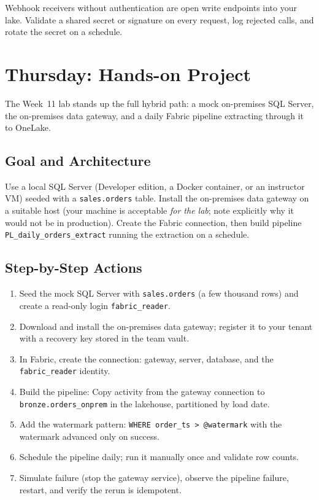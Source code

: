 \begin{pitfall}
Webhook receivers without authentication are open write endpoints into your lake. Validate a shared secret or signature on every request, log rejected calls, and rotate the secret on a schedule.
\end{pitfall}

\section{Thursday: Hands-on Project}
The Week~11 lab stands up the full hybrid path: a mock on-premises SQL Server, the on-premises data gateway, and a daily Fabric pipeline extracting through it to OneLake.

\subsection{Goal and Architecture}
Use a local SQL Server (Developer edition, a Docker container, or an instructor VM) seeded with a \texttt{sales.orders} table. Install the on-premises data gateway on a suitable host (your machine is acceptable \emph{for the lab}; note explicitly why it would not be in production). Create the Fabric connection, then build pipeline \texttt{PL\_daily\_orders\_extract} running the extraction on a schedule.

\subsection{Step-by-Step Actions}
\begin{enumerate}
    \item Seed the mock SQL Server with \texttt{sales.orders} (a few thousand rows) and create a read-only login \texttt{fabric\_reader}.
    \item Download and install the on-premises data gateway; register it to your tenant with a recovery key stored in the team vault.
    \item In Fabric, create the connection: gateway, server, database, and the \texttt{fabric\_reader} identity.
    \item Build the pipeline: Copy activity from the gateway connection to \texttt{bronze.orders\_onprem} in the lakehouse, partitioned by load date.
    \item Add the watermark pattern: \texttt{WHERE order\_ts > @watermark} with the watermark advanced only on success.
    \item Schedule the pipeline daily; run it manually once and validate row counts.
    \item Simulate failure (stop the gateway service), observe the pipeline failure, restart, and verify the rerun is idempotent.
\end{enumerate}

